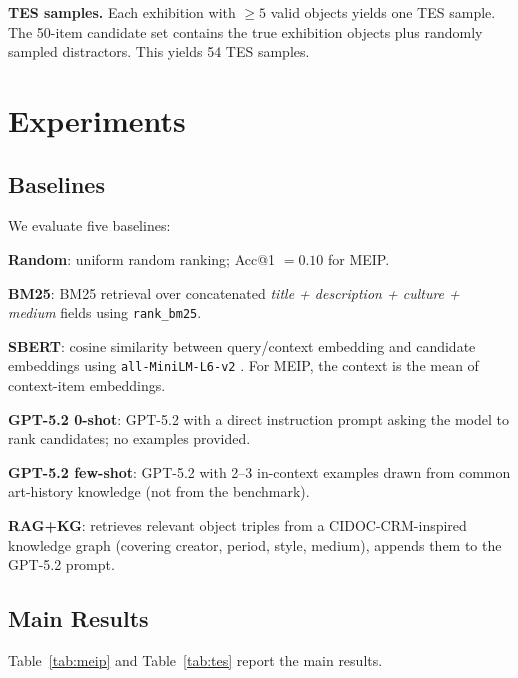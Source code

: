 \documentclass[11pt]{article}
\begin{document}
\noindent\textbf{TES samples.}
Each exhibition with $\geq 5$ valid objects yields one TES sample.
The 50-item candidate set contains the true exhibition objects plus randomly
sampled distractors.
This yields 54 TES samples.

\section{Experiments}
\label{sec:experiments}

\subsection{Baselines}

We evaluate five baselines:

\noindent\textbf{Random}: uniform random ranking; Acc@1 $= 0.10$ for MEIP.

\noindent\textbf{BM25}: BM25 retrieval over concatenated
\textit{title + description + culture + medium} fields using \texttt{rank\_bm25}.

\noindent\textbf{SBERT}: cosine similarity between query/context embedding and
candidate embeddings using \texttt{all-MiniLM-L6-v2}
\citep{reimers2019sentencebert}.
For MEIP, the context is the mean of context-item embeddings.

\noindent\textbf{GPT-5.2 0-shot}: GPT-5.2 with a direct instruction prompt
asking the model to rank candidates; no examples provided.

\noindent\textbf{GPT-5.2 few-shot}: GPT-5.2 with 2--3 in-context examples
drawn from common art-history knowledge (not from the benchmark).

\noindent\textbf{RAG+KG}: retrieves relevant object triples from a
CIDOC-CRM-inspired knowledge graph (covering creator, period, style, medium),
appends them to the GPT-5.2 prompt.

\subsection{Main Results}

Table~\ref{tab:meip} and Table~\ref{tab:tes} report the main results.
\end{document}
